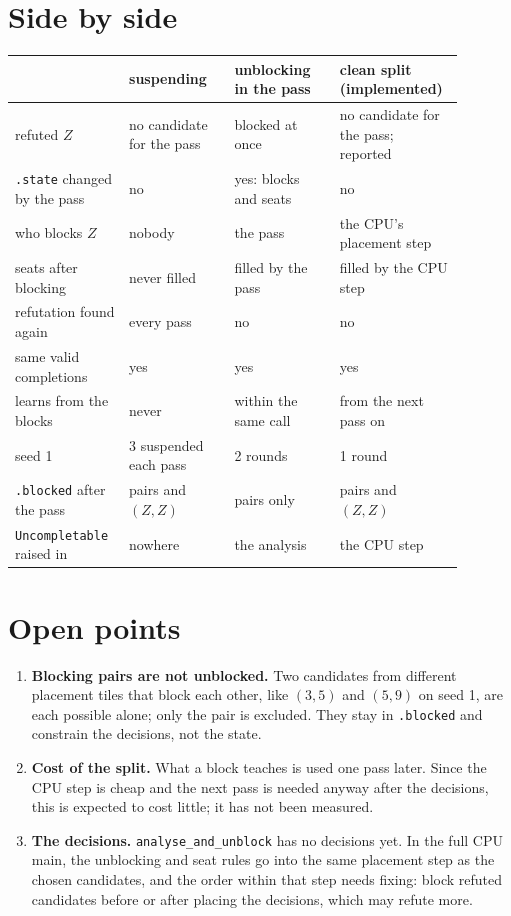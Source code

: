 \documentclass[10pt,a4paper]{article}
\newcommand{\code}[1]{\texttt{#1}}
\begin{document}
\section{Side by side}

\begin{center}\small
\begin{tabular}{@{}p{0.23\linewidth}p{0.22\linewidth}p{0.22\linewidth}p{0.22\linewidth}@{}}
\toprule
 & suspending & unblocking in the pass & clean split (implemented)\\
\midrule
refuted $Z$ & no candidate for the pass & blocked at once & no candidate for the pass; reported\\
\code{.state} changed by the pass & no & yes: blocks and seats & no\\
who blocks $Z$ & nobody & the pass & the CPU's placement step\\
seats after blocking & never filled & filled by the pass & filled by the CPU step\\
refutation found again & every pass & no & no\\
same valid completions & yes & yes & yes\\
learns from the blocks & never & within the same call & from the next pass on\\
seed 1 & 3 suspended each pass & 2 rounds & 1 round\\
\code{.blocked} after the pass & pairs and $(Z,Z)$ & pairs only & pairs and $(Z,Z)$\\
\code{Uncompletable} raised in & nowhere & the analysis & the CPU step\\
\bottomrule
\end{tabular}
\end{center}

\section{Open points}
\begin{enumerate}[leftmargin=*,itemsep=0.3em]
\item \textbf{Blocking pairs are not unblocked.} Two candidates from different placement tiles that block each other, like $(3,5)$ and $(5,9)$ on seed 1, are each possible alone; only the pair is excluded. They stay in \code{.blocked} and constrain the decisions, not the state.
\item \textbf{Cost of the split.} What a block teaches is used one pass later. Since the CPU step is cheap and the next pass is needed anyway after the decisions, this is expected to cost little; it has not been measured.
\item \textbf{The decisions.} \code{analyse\_and\_unblock} has no decisions yet. In the full CPU main, the unblocking and seat rules go into the same placement step as the chosen candidates, and the order within that step needs fixing: block refuted candidates before or after placing the decisions, which may refute more.
\end{enumerate}
\end{document}
